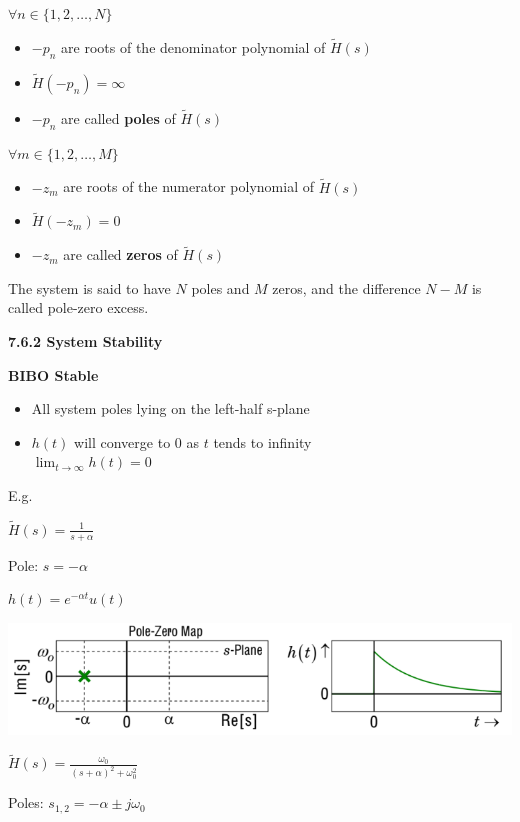 \documentclass[landscape,a4paper]{extarticle}
\newenvironment{Figure}
  {\par\medskip\noindent\minipage{\linewidth}}
  {\endminipage\par\medskip}
\begin{document}
\begin{multicols*}{5}
    $\forall n \in \{1,2, \ldots , N\}$ 
    \begin{itemize}
        \item $-p_n$ are roots of the denominator polynomial of $\tilde{H}(s)$
        \item $\tilde{H}(-p_n) = \infty$
        \item $-p_n$ are called \textbf{poles} of $\tilde{H}(s)$
    \end{itemize}
    $\forall m \in \{1,2, \ldots , M\}$ 
    \begin{itemize}
        \item $-z_m$ are roots of the numerator polynomial of $\tilde{H}(s)$
        \item $\tilde{H}(-z_m) = 0$
        \item $-z_m$ are called \textbf{zeros} of $\tilde{H}(s)$
    \end{itemize}

    The system is said to have $N$ poles and $M$ zeros, and the difference $N-M$ is called pole-zero excess.

    \textbf{7.6.2 System Stability}

    \textbf{BIBO Stable}
    \begin{itemize}
        \item All system poles lying on the left-half s-plane
        \item $h(t)$ will converge to 0 as $t$ tends to infinity\\
        $\lim_{t \to \infty} h(t) = 0$
    \end{itemize}

    E.g.

    $\tilde{H}(s) = \frac{1}{s + \alpha}$

    Pole: $s = - \alpha$

    $h(t) = e^{-\alpha t} u(t)$
    \begin{Figure}
        \centering
        \includegraphics[width=\linewidth]{biboStable1.png}        
    \end{Figure}

    $\tilde{H}(s) = \frac{\omega_0}{(s + \alpha)^2 + \omega_0^2}$

    Poles: $s_{1,2} = -\alpha \pm j\omega_0$


\end{multicols*}
\end{document}

